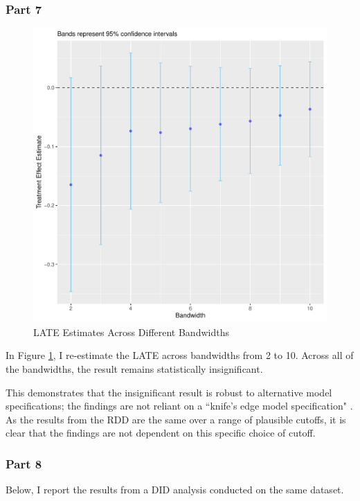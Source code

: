 \documentclass{article}\usepackage[]{graphicx}\usepackage[]{color}
\newenvironment{knitrout}{}{} %
\newenvironment{centerfig}
{\begin{figure}[H]\centering}
{\end{figure}}
\begin{document}
\subsubsection{Part 7}
\begin{centerfig}
\caption{LATE Estimates Across Different Bandwidths}
\label{bandwidth}
\begin{knitrout}
\color{fgcolor}
\includegraphics[width=1\linewidth]{figure/unnamed-chunk-8-1} 

\end{knitrout}
\end{centerfig}

In Figure \ref{bandwidth}, I re-estimate the LATE across bandwidths from 2 to 10.
Across all of the bandwidths, the result remains statistically insignificant.

This demonstrates that the insignificant result is robust to alternative model specifications;
the findings are not reliant on a ``knife's edge model specification" \parencite[][]{Mu_oz_2018}.
As the results from the RDD are the same over a range of plausible cutoffs, it is clear that the findings are not dependent on this specific choice of cutoff.

\subsubsection{Part 8}
Below, I report the results from a DID analysis conducted on the same dataset.
\end{document}
